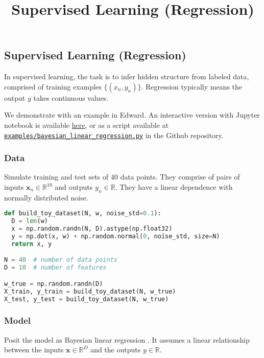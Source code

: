\title{Supervised Learning (Regression)}

\subsection{Supervised Learning (Regression)}

In supervised learning, the task is to infer hidden structure from
labeled data, comprised of training examples $\{(x_n, y_n)\}$.
Regression typically means the output $y$ takes continuous values.

We demonstrate with an example in Edward.
An interactive version with Jupyter notebook is available
\href{http://nbviewer.jupyter.org/github/blei-lab/edward/blob/master/docs/notebooks/supervised_regression.ipynb}{here},
or as a script available at
\href{https://github.com/blei-lab/edward/blob/master/examples/bayesian_linear_regression.py}
{\texttt{examples/bayesian_linear_regression.py}} in the Github repository.

\subsubsection{Data}

Simulate training and test sets of $40$ data points. They comprise of
pairs of inputs $\mathbf{x}_n\in\mathbb{R}^{10}$ and outputs
$y_n\in\mathbb{R}$. They have a linear dependence with normally
distributed noise.

\begin{lstlisting}[language=Python]
def build_toy_dataset(N, w, noise_std=0.1):
  D = len(w)
  x = np.random.randn(N, D).astype(np.float32)
  y = np.dot(x, w) + np.random.normal(0, noise_std, size=N)
  return x, y

N = 40  # number of data points
D = 10  # number of features

w_true = np.random.randn(D)
X_train, y_train = build_toy_dataset(N, w_true)
X_test, y_test = build_toy_dataset(N, w_true)
\end{lstlisting}

\subsubsection{Model}

Posit the model as Bayesian linear regression \citep{murphy2012machine}.
It assumes a linear relationship between the inputs
$\mathbf{x}\in\mathbb{R}^D$ and the outputs $y\in\mathbb{R}$.

